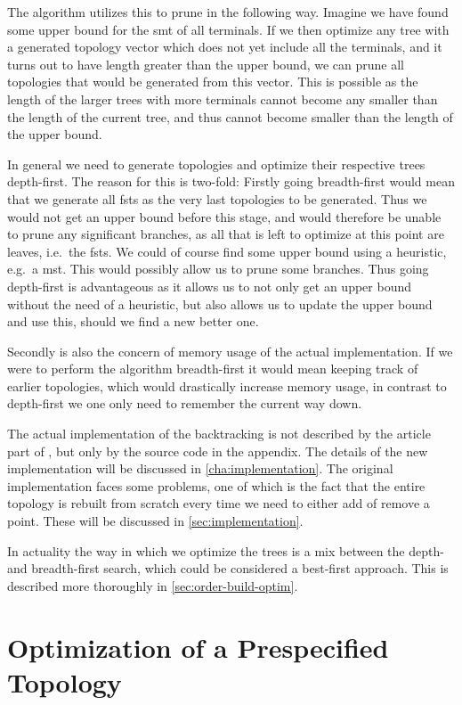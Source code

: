The algorithm utilizes this to prune in the following way. Imagine we have found
some upper bound for the \ac{smt} of all terminals. If we then optimize any tree
with a generated topology vector which does not yet include all the terminals,
and it turns out to have length greater than the upper bound, we can prune all
topologies that would be generated from this vector. This is possible as the
length of the larger trees with more terminals cannot become any smaller than
the length of the current tree, and thus cannot become smaller than the length
of the upper bound.

In general we need to generate topologies and optimize their respective trees
depth-first. The reason for this is two-fold: Firstly going breadth-first would
mean that we generate all \acp{fst} as the very last topologies to be generated.
Thus we would not get an upper bound before this stage, and would therefore be
unable to prune any significant branches, as all that is left to optimize at
this point are leaves, i.e.\ the \acp{fst}. We could of course find some upper
bound using a heuristic, e.g.\ a \ac{mst}. This would possibly allow us to prune
some branches. Thus going depth-first is advantageous as it allows us to not
only get an upper bound without the need of a heuristic, but also allows us to
update the upper bound and use this, should we find a new better one.

Secondly is also the concern of memory usage of the actual implementation. If we
were to perform the algorithm breadth-first it would mean keeping track of
earlier topologies, which would drastically increase memory usage, in contrast
to depth-first we one only need to remember the current way down.

The actual implementation of the backtracking is not described by the article
part of \textcite{smith1992}, but only by the source code in the appendix. The
details of the new implementation will be discussed in
\cref{cha:implementation}. The original implementation faces some problems,
one of which is the fact that the entire topology is rebuilt from scratch every
time we need to either add of remove a point. These will be discussed in
\cref{sec:implementation}.

In actuality the way in which we optimize the trees is a mix between the depth-
and breadth-first search, which could be considered a best-first approach. This
is described more thoroughly in \cref{sec:order-build-optim}.

\section{Optimization of a Prespecified Topology}
\label{sec:optim-presp-topol}

